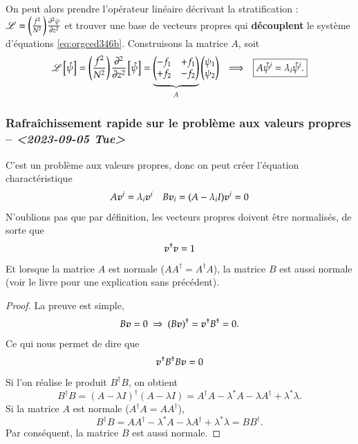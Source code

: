 \documentclass[10pt]{article}
\numberwithin{equation}{section}
\newcommand{\vv}{\vb*{v}}
\newcommand{\pt}{\hspace{1pt}}
\begin{document}
On peut alors prendre l'opérateur linéaire décrivant la stratification : \(\mathscr{L} = \qty(\frac{f^2}{N^2})\pt\pdv[2]{\psi}{z}\) et trouver une base de vecteurs propres qui \textbf{découplent} le système d'équations \ref{eq:orgced346b}.
Construisons la matrice \(A\), soit
\begin{align}
\label{eq:org1caaf75}
&& \mathscr{L} \pt\qty[ \hat{\psi} ] = \qty(\frac{f^2}{N^2})\pt\pdv[2]{}{z} \pt\qty[\hat{\psi}]= 
   \underbrace{
   \begin{pmatrix}
     -f_1 & +f_1 \\
     +f_2 & -f_2 \\
   \end{pmatrix}}_{A}
   \begin{pmatrix}
     \psi_1 \\
     \psi_2 \\
   \end{pmatrix}
   && \Longrightarrow
   && \boxed{ A \hat{\psi}^i = \lambda_i \hat{\psi}^i. } &&
\end{align}

\subsubsection{Rafraîchissement rapide sur le problème aux valeurs propres -- \textit{<2023-09-05 Tue>}}
\label{sec:org9802c44}

C'est un problème aux valeurs propres, donc on peut créer l'équation charactéristique
\begin{align}
\label{eq:orga7ccc73}
   && A \vv^i = \lambda_i \vv^i && B \vv_i = (A - \lambda_i I)\vv^i = 0 &&
\end{align}
N'oublions pas que par définition, les vecteurs propres doivent être normalisés, de sorte que
\begin{equation}
   \vv^\dagger \vv = 1
\end{equation}
Et lorsque la matrice \(A\) est normale (\(AA^\dagger = A^\dagger A\)), la matrice \(B\) est aussi normale (voir le livre \citet*[p.274 pour un résumé sans précédent]{riley_hobson_bence_2006} pour une explication sans précédent).
\begin{proof}
La preuve est simple, 
\begin{equation}
   B\vv = 0 \ \Rightarrow\ (B\vv)^\dagger = \vv^\dagger B^\dagger = 0. 
\end{equation}
Ce qui nous permet de dire que
\begin{equation}
   \vv^\dagger B^\dagger B \vv = 0
\end{equation}
Si l'on réalise le produit $B^\dagger B$, on obtient
\begin{equation}
   B^\dagger B = (A-\lambda I)^\dagger (A-\lambda I) = A^\dagger A - \lambda^* A -\lambda A^\dagger + \lambda^*\lambda.
\end{equation}
Si la matrice $A$ est normale ($A^\dagger A = A A^\dagger$),
\begin{equation}
   B^\dagger B = A A^\dagger - \lambda^* A -\lambda A^\dagger + \lambda^*\lambda = BB^\dagger.
\end{equation}
Par conséquent, la matrice $B$ est aussi normale.
\end{proof}
\end{document}
